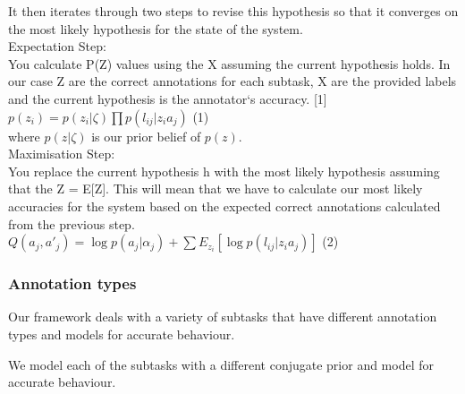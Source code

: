 \documentclass[11pt]{article}
\begin{document}
It then iterates through two steps to revise this hypothesis so that it converges on the most likely hypothesis for the state of the system.\\

Expectation Step:\\
You calculate P(Z) values using the X assuming the current hypothesis holds. In our case Z are the correct annotations for each subtask, X are the provided labels and the current hypothesis is the annotator`s accuracy. [1]\\

$ p(z_{i}) = p(z_{i}|\zeta) \prod p (l_{ij} | z_{i} a_{j}) $ (1)\\

where $p(z|\zeta)$ is our prior belief of $p(z)$.\\

Maximisation Step:\\
You replace the current hypothesis h with the most likely hypothesis assuming that the Z = E[Z]. This will mean that we have to calculate our most likely accuracies for the system based on the expected correct annotations calculated from the previous step.\\

$ Q(a_{j},a\prime_{j}) = \log p(a_{j}|\alpha_{j}) + \sum E_{z_{i}} [\log p (l_{ij} | z_{i} a_{j})]$ (2)\\

\subsubsection{Annotation types}

Our framework deals with a variety of subtasks that have different annotation types and models for accurate behaviour.

We model each of the subtasks with a different conjugate prior and model for accurate behaviour.\\
\end{document}
